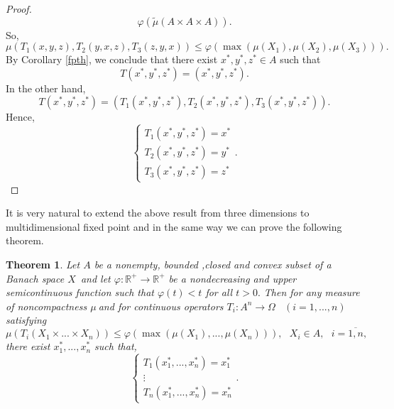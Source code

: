 \documentclass{amsart}
\newtheorem{theorem}{Theorem}
\theoremstyle{plain}
\numberwithin{equation}{section}
\begin{document}
\begin{proof}
\begin{equation*}
\varphi \left( \widetilde{\mu }\left( A\times A\times A\right) \right) .
\end{equation*}So,\begin{equation*}
\mu \left( T_{1}\left( x,y,z\right) ,T_{2}\left( y,x,z\right) ,T_{3}\left(
z,y,x\right) \right) \leqslant \varphi \left( \max \left( \mu \left(
X_{1}\right) ,\mu \left( X_{2}\right) ,\mu \left( X_{3}\right) \right)
\right) .
\end{equation*}By Corollary \ref{fpth}, we conclude that there exist $x^{\ast },y^{\ast
},z^{\ast }\in A$ such that\begin{equation*}
T\left( x^{\ast },y^{\ast },z^{\ast }\right) =\left( x^{\ast },y^{\ast
},z^{\ast }\right) .
\end{equation*}In the other hand,\begin{equation*}
T\left( x^{\ast },y^{\ast },z^{\ast }\right) =\left( T_{1}\left( x^{\ast
},y^{\ast },z^{\ast }\right) ,T_{2}\left( x^{\ast },y^{\ast },z^{\ast
}\right) ,T_{3}\left( x^{\ast },y^{\ast },z^{\ast }\right) \right) .
\end{equation*}Hence,\begin{equation*}
\left\{ 
\begin{array}{c}
T_{1}\left( x^{\ast },y^{\ast },z^{\ast }\right) =x^{\ast } \\ 
T_{2}\left( x^{\ast },y^{\ast },z^{\ast }\right) =y^{\ast } \\ 
T_{3}\left( x^{\ast },y^{\ast },z^{\ast }\right) =z^{\ast }\end{array}\right. .
\end{equation*}
\end{proof}

It is very natural to extend the above result from three dimensions to
multidimensional fixed point and in the same way we can prove the following
theorem.

\begin{theorem}
Let $A$ be a nonempty, bounded ,closed and convex subset of a Banach space $X $\ and let $\varphi :\mathbb{R}^{+}\rightarrow \mathbb{R}^{+}$ be a
nondecreasing and upper semicontinuous function such that $\varphi \left(
t\right) <t$ for all $t>0.$ Then for any measure of noncompactness $\mu \ $and for continuous operators $T_{i}:A^{n}\rightarrow \Omega $ \ $\left(
i=1,...,n\right) $ satisfying\begin{equation*}
\mu \left( T_{i}\left( X_{1}\times ...\times X_{n}\right) \right) \leqslant
\varphi \left( \max \left( \mu \left( X_{1}\right) ,...,\mu \left(
X_{n}\right) \right) \right) ,\text{ }X_{i}\in A,\text{ }i=\overline{1,n},
\end{equation*}there exist $x_{1}^{\ast },...,x_{n}^{\ast }$ such that,\begin{equation*}
\left\{ 
\begin{array}{c}
T_{1}\left( x_{1}^{\ast },...,x_{n}^{\ast }\right) =x_{1}^{\ast } \\ 
\vdots \\ 
T_{n}\left( x_{1}^{\ast },...,x_{n}^{\ast }\right) =x_{n}^{\ast }\end{array}\right. .
\end{equation*}
\end{theorem}
\end{document}
